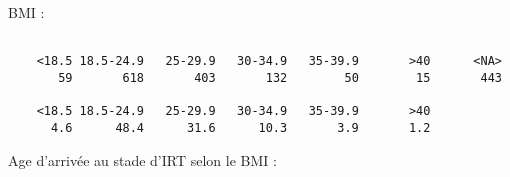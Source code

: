 \documentclass[11pt,a4paper]{article}\usepackage[]{graphicx}\usepackage[]{color}
\makeatletter
\newenvironment{kframe}{%
 \def\at@end@of@kframe{}%
 \ifinner\ifhmode%
  \def\at@end@of@kframe{\end{minipage}}%
  \begin{minipage}{\columnwidth}%
 \fi\fi%
 \def\FrameCommand##1{\hskip\@totalleftmargin \hskip-\fboxsep
 \colorbox{shadecolor}{##1}\hskip-\fboxsep
     \hskip-\linewidth \hskip-\@totalleftmargin \hskip\columnwidth}%
 \MakeFramed {\advance\hsize-\width
   \@totalleftmargin\z@ \linewidth\hsize
   \@setminipage}}%
 {\par\unskip\endMakeFramed%
 \at@end@of@kframe}
\newenvironment{knitrout}{}{} %
\makeatother
\begin{document}
BMI :

\begin{knitrout}
\color{fgcolor}\begin{kframe}
\begin{verbatim}

    <18.5 18.5-24.9   25-29.9   30-34.9   35-39.9       >40      <NA> 
       59       618       403       132        50        15       443 

    <18.5 18.5-24.9   25-29.9   30-34.9   35-39.9       >40 
      4.6      48.4      31.6      10.3       3.9       1.2 
\end{verbatim}
\end{kframe}
\end{knitrout}

Age d'arrivée au stade d'IRT selon le BMI :
\end{document}
